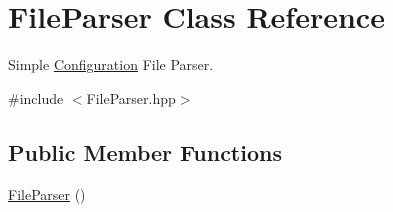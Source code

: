 \hypertarget{classFileParser}{
\section{FileParser Class Reference}
\label{classFileParser}
}


Simple \hyperlink{classConfiguration}{Configuration} File Parser.  




{\ttfamily \#include $<$FileParser.hpp$>$}

\subsection*{Public Member Functions}
\begin{DoxyCompactItemize}
\item 
\hypertarget{classFileParser_acb58172b4650cd8015d5e8cad7d29647}{
\hyperlink{classFileParser_acb58172b4650cd8015d5e8cad7d29647}{FileParser} ()}
\label{classFileParser_acb58172b4650cd8015d5e8cad7d29647}


\end{DoxyCompactItemize}
